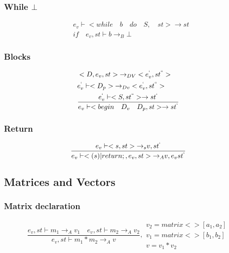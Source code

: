 \subsubsection{While $\bot$}
\begin{align*}
	&{ e }_{ v }\vdash <while\quad b\quad do\quad S,\quad st>\rightarrow st\\
	&if\quad { e }_{ v },st\vdash b{ \rightarrow  }_{ B }\bot
\end{align*}

\subsubsection{Blocks}
\begin{align*}
&<D,{ e }_{ v },st>{ \rightarrow  }_{ DV }<{ e }_{ v }^{ ` },{ st }^{ `` }>\\
&{ e }_{ v }^{ ` }\vdash <{ D }_{ p }>{ \rightarrow  }_{ Dv }<{ e }_{ v }^{ ` },{ st }^{ `` }>\\
&\frac { { e }_{ v }^{ ` }\vdash <S,{ st }^{ `` }>\rightarrow { st }^{ ` } }{ { e }_{ v }\vdash <begin\quad { D }_{ v }\quad { D }_{ p },st>\rightarrow { st }^{ ` } } 
\end{align*}

\subsubsection{Return}
\begin{equation}
	\frac { { e }_{ v }\vdash <{ s },st>{ \rightarrow  }_{ s }v,{ st }^{ ` } }{ { e }_{ v }\vdash <(s)|return;,{ e }_{ v },st>{ \rightarrow  }_{ A }v,{ e }_{ v }{ st }^{ ` } } 
\end{equation}


\subsection*{Matrices and Vectors}
\subsubsection{Matrix declaration}
\begin{equation}
	\frac { { e }_{ v },st\vdash { m }_{ 1 }{ \rightarrow  }_{ A }{ v }_{ 1 }\quad { e }_{ v },st\vdash { m }_{ 2 }{ \rightarrow  }_{ A }{ v }_{ 2 } }{ { e }_{ v },st\vdash { m }_{ 1 }*{ m }_{ 2 }{ \rightarrow  }_{ A }{ v } } ,\begin{matrix} { v }_{ 2 }=matrix<>[{ a }_{ 1 },{ a }_{ 2 }] \\ { v }_{ 1 }=matrix<>[{ b }_{ 1 },{ b }_{ 2 }] \\ v={ v }_{ 1 }*{ v }_{ 2 } \end{matrix}
	\end{equation}

